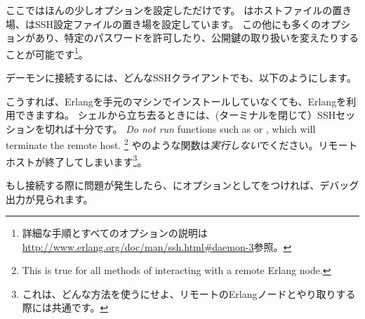 ここではほんの少しオプションを設定しただけです。
はホストファイルの置き場、はSSH設定ファイルの置き場を設定しています。
この他にも多くのオプションがあり、特定のパスワードを許可したり、公開鍵の取り扱いを変えたりすることが可能です\footnote{詳細な手順とすべてのオプションの説明は \href{http://www.erlang.org/doc/man/ssh.html\#daemon-3}{http://www.erlang.org/doc/man/ssh.html\#daemon-3}参照。}。%


デーモンに接続するには、どんなSSHクライアントでも、以下のようにします。


こうすれば、Erlangを手元のマシンでインストールしていなくても、Erlangを利用できますね。
シェルから立ち去るときには、(ターミナルを閉じて）SSHセッションを切れば十分です。
\emph{Do not run} functions such as  or , which will terminate the remote host.
\footnote{This is true for all methods of interacting with a remote Erlang node.}
やのような関数は\emph{実行しない}でください。リモートホストが終了してしまいます\footnote{これは、どんな方法を使うにせよ、リモートのErlangノードとやり取りする際には共通です。}。

もし接続する際に問題が発生したら、にオプションとしてをつければ、デバッグ出力が見られます。

